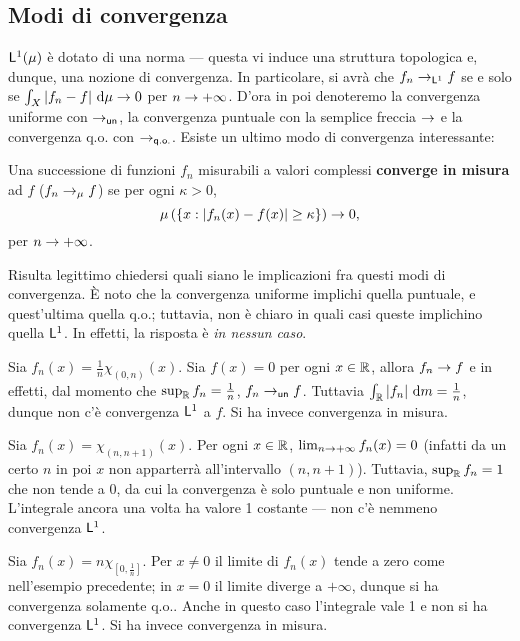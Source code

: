 \documentclass[Completo.tex]{subfiles}
\begin{document}
	\subsection{Modi di convergenza}
	$\sf[L]^1(\mu)$ è dotato di una norma --- questa vi induce una struttura topologica e, dunque, una nozione di convergenza. In particolare, si avrà che $f_n \ra_{\sf[L]^1} f$ se e solo se $\int_X \vert f_n - f \vert \ \mathrm{d}\mu \rightarrow 0$ per $n \rightarrow +\infty$. D'ora in poi denoteremo la convergenza uniforme con $\ra_{\sf[un]}$, la convergenza puntuale con la semplice freccia $\rightarrow$ e la convergenza q.o. con $\ra_{\sf[q.o.]}$. Esiste un ultimo modo di convergenza interessante:
	\begin{Def}
		Una successione di funzioni $f_n$ misurabili a valori complessi \textbf{converge in misura} ad $f$ ($f_n \rightarrow_{\mu} f$) se per ogni $\kappa > 0$,
		\begin{equation*}
		\mu\left(\{x: \vert f_n(x) - f(x) \vert \geq \kappa\}\right) \rightarrow 0,
		\end{equation*}
		per $n \rightarrow +\infty$.
	\end{Def}
	Risulta legittimo chiedersi quali siano le implicazioni fra questi modi di convergenza. È noto che la convergenza uniforme implichi quella puntuale, e quest'ultima quella q.o.; tuttavia, non è chiaro in quali casi queste implichino quella $\sf[L]^1$. In effetti, la risposta è \textit{in nessun caso}.
	\begin{Ex}
		Sia $f_n(x) = \frac{1}{n} \chi_{(0,n)}(x)$. Sia $f(x) = 0$ per ogni $x \in \bb[R]$, allora $f_n \rightarrow f$ e in effetti, dal momento che $\sup_{\bb[R]} f_n = \frac{1}{n}$, $f_n \ra_{\sf[un]} f$. Tuttavia $\int_{\bb[R]} \vert f_n \vert \ \mathrm{d}m = \frac{1}{n}$, dunque non c'è convergenza $\sf[L]^1$ a $f$. Si ha invece convergenza in misura.
	\end{Ex}
	\begin{Ex}
		Sia $f_n(x) = \chi_{(n, n+1)}(x)$. Per ogni $x \in \bb[R]$, $\lim_{n \rightarrow +\infty} f_n(x) = 0$ (infatti da un certo $n$ in poi $x$ non apparterrà all'intervallo $(n, n+1)$). Tuttavia, $\sup_{\bb[R]} f_n = 1$ che non tende a 0, da cui la convergenza è solo puntuale e non uniforme. L'integrale ancora una volta ha valore 1 costante --- non c'è nemmeno convergenza $\sf[L]^1$.
	\end{Ex}
	\begin{Ex}
		Sia $f_n(x) = n \chi_{[0, \frac{1}{n}]}$.  Per $x \neq 0$ il limite di $f_n(x)$ tende a zero come nell'esempio precedente; in $x = 0$ il limite diverge a $+\infty$, dunque si ha convergenza solamente q.o.. Anche in questo caso l'integrale vale 1 e non si ha convergenza $\sf[L]^1$. Si ha invece convergenza in misura.
	\end{Ex}
\end{document}
